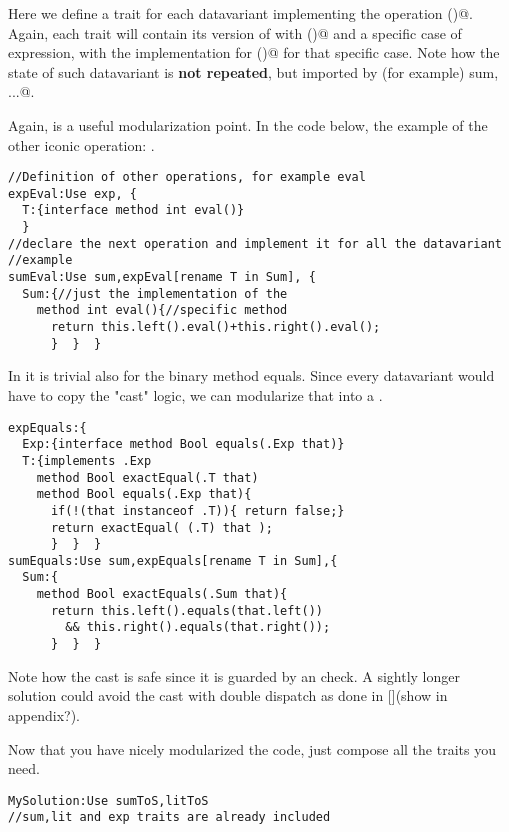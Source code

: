 Here we define a trait for each datavariant implementing the operation \Q@toString()@.
Again, each trait will contain its version of \Q@Exp@ with \Q@toString()@
and a specific case of expression, with the implementation for \Q@toString()@
for that specific case. Note how the state of such datavariant is 
\textbf{not repeated}, but imported by (for example) \Q@Use sum, ...@.

Again, \Q@expToS@ is a useful modularization point.
In the code below, the example of the other iconic operation: \Q@eval@.

\begin{lstlisting}
//Definition of other operations, for example eval
expEval:Use exp, {
  T:{interface method int eval()}
  }
//declare the next operation and implement it for all the datavariant
//example
sumEval:Use sum,expEval[rename T in Sum], {
  Sum:{//just the implementation of the
    method int eval(){//specific method
      return this.left().eval()+this.right().eval();
      }  }  }
\end{lstlisting}
In \name it is trivial also for the binary method equals.
Since every datavariant would have to copy the "cast" logic,
 we can modularize that into a \Q@expEquals@.

\begin{lstlisting}
expEquals:{
  Exp:{interface method Bool equals(.Exp that)}
  T:{implements .Exp
    method Bool exactEqual(.T that)
    method Bool equals(.Exp that){
      if(!(that instanceof .T)){ return false;}
      return exactEqual( (.T) that );
      }  }  }
sumEquals:Use sum,expEquals[rename T in Sum],{
  Sum:{
    method Bool exactEquals(.Sum that){
      return this.left().equals(that.left()) 
        && this.right().equals(that.right());
      }  }  }
\end{lstlisting}
Note how the cast is safe since it is guarded by
an \Q@instanceof@ check. A sightly longer solution could avoid the
cast with double dispatch as done in [](show in appendix?).

Now that you have nicely modularized the code, just compose all the traits you need.
\begin{lstlisting}
MySolution:Use sumToS,litToS
//sum,lit and exp traits are already included
\end{lstlisting}


